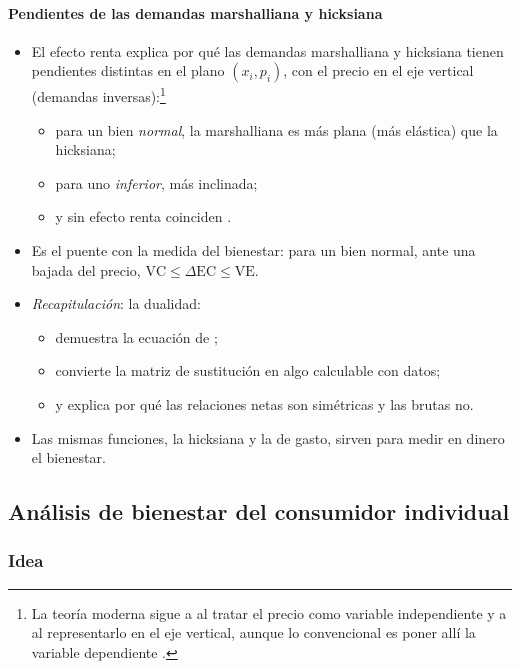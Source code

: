 \documentclass[11pt]{article}
\begin{document}
\paragraph{Pendientes de las demandas marshalliana y hicksiana}

\begin{itemize}
\item El efecto renta explica por qué las demandas marshalliana y hicksiana tienen pendientes distintas en el plano $(x_i,p_i)$, con el precio en el eje vertical (demandas inversas):\footnote{La teoría moderna sigue a  al tratar el precio como variable independiente y a  al representarlo en el eje vertical, aunque lo convencional es poner allí la variable dependiente .} 
  \begin{itemize}
  \item para un bien \emph{normal}, la marshalliana es más plana (más elástica) que la hicksiana;
  \item para uno \emph{inferior}, más inclinada;
  \item y sin efecto renta coinciden .
  \end{itemize}
\item Es el puente con la medida del bienestar: para un bien normal, ante una bajada del precio, $\mathrm{VC}\leq\Delta\mathrm{EC}\leq \mathrm{VE}$.
\item \emph{Recapitulación}: la dualidad:
  \begin{itemize}
  \item demuestra la ecuación de ;
  \item convierte la matriz de sustitución en algo calculable con datos;
  \item y explica por qué las relaciones netas son simétricas y las brutas no.
  \end{itemize}
\item Las mismas funciones, la hicksiana y la de gasto, sirven para medir en dinero el bienestar.
\end{itemize}

\subsection{Análisis de bienestar del consumidor individual}\label{sec:analisis-bienestar-consumidor}

\subsubsection{Idea}\label{sec:idea-2}
\end{document}

